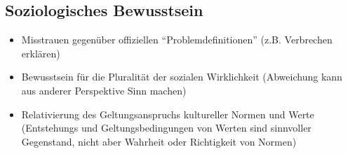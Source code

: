 \documentclass[a4paper, 12pt]{scrartcl}
\begin{document}
\subsection{Soziologisches Bewusstsein}
\begin{itemize}
	\item
		Misstrauen gegenüber offiziellen \enquote{Problemdefinitionen} (z.B. Verbrechen erklären)
	\item
		Bewusstsein für die Pluralität der sozialen Wirklichkeit (Abweichung kann aus anderer Perspektive Sinn machen)
	\item
		Relativierung des Geltungsanspruchs kultureller Normen und Werte (Entstehungs und Geltungsbedingungen von Werten sind sinnvoller Gegenstand, nicht aber Wahrheit oder Richtigkeit von Normen)
\end{itemize}
\end{document}
